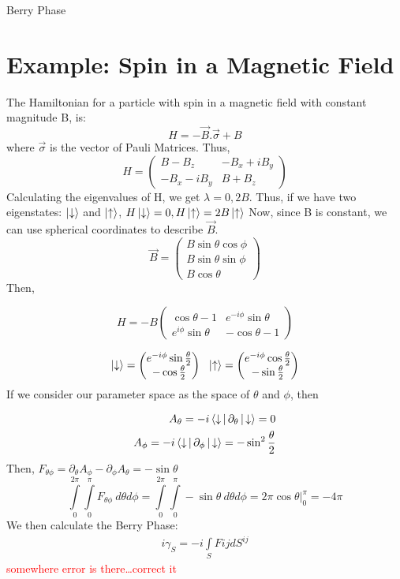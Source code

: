 \documentclass[12pt, oneside, listof=totoc,dvipsnames]{scrbook}
\begin{document}
\begin{chapter}{Berry Phase}
		\section{Example: Spin in a Magnetic Field}
		The Hamiltonian for a particle with spin in a magnetic field with constant magnitude B, is: 
		$$H= - \overrightarrow{B}.\overrightarrow{\sigma}+B$$
		where $\overrightarrow{\sigma} $ is the vector of Pauli Matrices.
		Thus, 
		\[ H = \begin{pmatrix}
			B-B_z & -B_x+iB_y \\ -B_x -iB_y & B+B_z
		\end{pmatrix} \]
		Calculating the eigenvalues of H, we get $\lambda=0, 2B$. Thus, if we have two eigenstates: $\ket{\downarrow}$ and $\ket{\uparrow}$, $H\ket{\downarrow} = 0, H \ket{\uparrow}=2B\ket{\uparrow}$
		Now, since B is constant, we can use spherical coordinates to describe $\vec{B}$. 
		$$\overrightarrow{B} = \begin{pmatrix}
			B\sin \theta \cos \phi \\
			B\sin \theta \sin \phi \\
			B \cos \theta
		\end{pmatrix}$$
		Then, 
		
		\[ H = -B \begin{pmatrix}
			\cos \theta -1 & e^{-i\phi}\sin \theta \\
			e^{i\phi}\sin \theta & -\cos\theta-1
		\end{pmatrix} \]
		
		\[\ket{\downarrow} = \begin{pmatrix}
			e^{-i\phi}\sin\frac{\theta}{2} \\ -\cos \frac{\theta}{2}
		\end{pmatrix} \ \ \ket{\uparrow} = \begin{pmatrix}
			e^{-i\phi}\cos\frac{\theta}{2} \\ -\sin \frac{\theta}{2}
		\end{pmatrix}
		\]
		If we consider our parameter space as the space of $\theta$ and $\phi$, then 
		
		\begin{align*}
			A_\theta = -i \Braket{ \downarrow |\partial_\theta |\downarrow}=0\\
			A_\phi = -i \Braket{\downarrow |\partial_\phi |\downarrow}= -\sin^2 \frac{\theta}{2}
		\end{align*}
		Then, $F_{\theta\phi}= \partial_\theta A_\phi-\partial_\phi A_\theta = -\sin\theta$
		\[\int \limits_0^{2\pi}\int\limits_0^\pi F_{\theta\phi}\  d\theta d\phi= \int \limits_0^{2\pi}\int\limits_0^\pi -\sin\theta\  d\theta d\phi = 2\pi \cos\theta \Biggr|_0^\pi=-4\pi\]
		We then calculate the Berry Phase:
		\begin{align*}
			i\gamma_S= -i \int\limits_S F{ij} dS^{ij}
		\end{align*}
		\textcolor{red}{somewhere error is there\ldots correct it}
		

\end{chapter}
\end{document}
